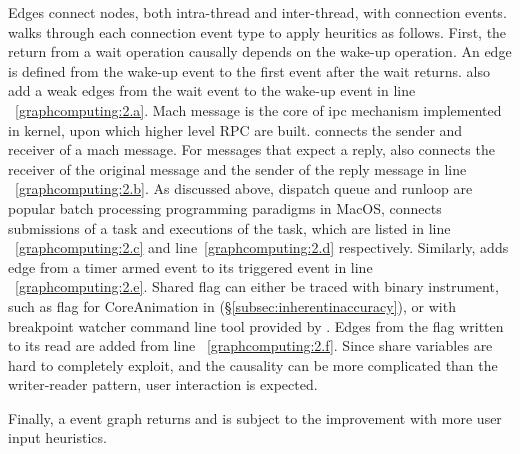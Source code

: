 Edges connect nodes, both intra-thread and inter-thread, with connection
events. \xxx walks through each connection event type to apply heuritics as
follows. First, the return from a wait operation causally depends on the wake-up
operation. An edge is defined from the wake-up event to the first event after
the wait returns. \xxx also add a weak edges from the wait event to the wake-up
event in line ~\ref{graphcomputing:2.a}. Mach message is the core of ipc
mechanism implemented in kernel, upon which higher level RPC are built. \xxx
connects the sender and receiver of a mach message. For messages that expect a
reply, \xxx also connects the receiver of the original message and the sender
of the reply message in line ~\ref{graphcomputing:2.b}. As discussed above,
dispatch queue and runloop are popular batch processing programming paradigms
in MacOS, \xxx connects submissions of a task and executions of the task, which
are listed in line ~\ref{graphcomputing:2.c} and line~\ref{graphcomputing:2.d}
respectively. Similarly, \xxx adds edge from a timer armed event to its
triggered event in line ~\ref{graphcomputing:2.e}. Shared flag can either be
traced with binary instrument, such as  flag for CoreAnimation
in (\S\ref{subsec:inherentinaccuracy}), or with breakpoint watcher command line
tool provided by \xxx. Edges from the flag written to its read are added from
line ~\ref{graphcomputing:2.f}. Since share variables are hard to completely
exploit, and the causality can be more complicated than the writer-reader
pattern, user interaction is expected.

Finally, a event graph returns and is subject to the improvement with
more user input heuristics.

